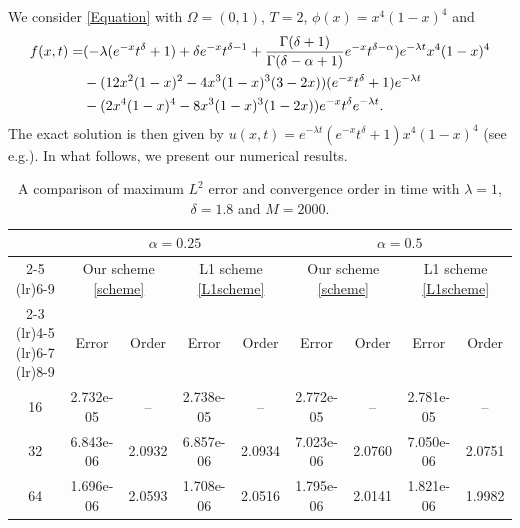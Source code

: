 \documentclass[10pt, reqno]{amsart}
\theoremstyle{remark}
\theoremstyle{definition}
\numberwithin{table}{section}
\begin{document}
We consider \eqref{Equation} with $\Omega=(0,1)$, $T=2$, $\phi(x)=x^4(1-x)^4$ and 
\begin{align}
f(x,t) = & ( -\lambda (e^{-x}t^\delta + 1) + \delta e^{-x} t^{\delta - 1} + \frac{\Gamma(\delta+1)}{\Gamma(\delta-\alpha+1)}e^{-x} t^{\delta-\alpha} ) e^{-\lambda t}x^4(1-x)^4 \notag\\
& - ( 12x^2(1-x)^2-4x^3(1-x)^3(3-2x)) (e^{-x}t^\delta + 1) e^{-\lambda t}\notag\\
& - (2x^4(1-x)^4-8x^3(1-x)^3(1-2x))e^{-x}t^\delta e^{-\lambda t}.\notag
\end{align}
The exact solution is then given by $u(x,t) = e^{-\lambda t} (e^{-x}t^\delta + 1)x^4(1-x)^4$ (see e.g.\cite{gao2012,jiang2017}). In what follows, we present our numerical results.    
\begin{table}[htbp]
\centering
\setlength{\tabcolsep}{5pt}   %
\caption{A comparison of maximum $L^2$ error and convergence order in time with $\lambda=1$, $\delta=1.8$ and $M=2000$.}
\label{table:errors3t}
\begin{tabular}{c c c c c c c c c}
\toprule
& \multicolumn{4}{c}{$\alpha=0.25$} 
& \multicolumn{4}{c}{$\alpha=0.5$} \\
\cmidrule(lr){2-5} \cmidrule(lr){6-9}
 & \multicolumn{2}{c}{Our scheme \eqref{scheme}} & \multicolumn{2}{c}{L1 scheme \eqref{L1scheme}}   & \multicolumn{2}{c}{Our scheme \eqref{scheme}} & \multicolumn{2}{c}{L1 scheme \eqref{L1scheme}} \\
\cmidrule(lr){2-3} \cmidrule(lr){4-5} \cmidrule(lr){6-7} \cmidrule(lr){8-9}
\multirow{1}{*}{$N$} & Error & Order & Error & Order & Error & Order & Error & Order \\
\midrule
16
& 2.732e-05 & --     & 2.738e-05 & --     & 2.772e-05 & --     & 2.781e-05 & -- \\
32
& 6.843e-06 & 2.0932     & 6.857e-06 & 2.0934     & 7.023e-06 & 2.0760     & 7.050e-06 & 2.0751 \\
64
& 1.696e-06 & 2.0593     & 1.708e-06 & 2.0516     & 1.795e-06 & 2.0141     & 1.821e-06 & 1.9982 \\
\bottomrule
\end{tabular}
\end{table}
\end{document}
